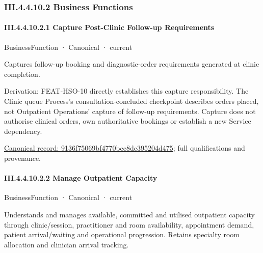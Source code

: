 \subsubsection*{III.4.4.10.2 Business Functions}
\label{navigation:III.4.4.10.2}

\paragraph*{III.4.4.10.2.1 Capture Post-Clinic Follow-up Requirements}
\label{navigation:III.4.4.10.2.1}

\label{element:9136f75069bf4770bcc8dc395204d475}
{\small BusinessFunction · Canonical · current}\par

Captures follow-up booking and diagnostic-order requirements generated at clinic completion.



Derivation: FEAT-HSO-10 directly establishes this capture responsibility. The Clinic queue Process's consultation-concluded checkpoint describes orders placed, not Outpatient Operations' capture of follow-up requirements. Capture does not authorise clinical orders, own authoritative bookings or establish a new Service dependency.


{\footnotesize \href{../../../../../../../continuum/business/business-function/9136f75069bf4770bcc8dc395204d475.md}{Canonical record: 9136f75069bf4770bcc8dc395204d475}; full qualifications and provenance.}\par
\paragraph*{III.4.4.10.2.2 Manage Outpatient Capacity}
\label{navigation:III.4.4.10.2.2}

\label{element:45fd6190b7334f838575881725f6a66b}
{\small BusinessFunction · Canonical · current}\par

Understands and manages available, committed and utilised outpatient capacity through clinic/session, practitioner and room availability, appointment demand, patient arrival/waiting and operational progression. Retains specialty room allocation and clinician arrival tracking.



